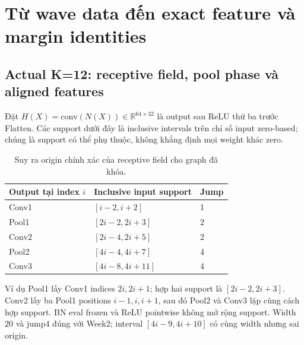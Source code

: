 \documentclass[11pt,a4paper]{article}
\newcommand{\R}{\mathbb R}
\theoremstyle{remark}
\begin{document}
\section{Từ wave data đến exact feature và margin identities}
\subsection{Actual K=12: receptive field, pool phase và aligned features}
\label{sec:actual-feature}
Đặt $H(X)=\mathrm{conv}(N(X))\in\R^{64\times32}$ là output sau ReLU thứ ba trước Flatten.
Các support dưới đây là inclusive intervals trên chỉ số input zero-based;
chúng là support có thể phụ thuộc, không khẳng định mọi weight khác zero.
\begin{table}[!htbp]\centering
\caption{Suy ra origin chính xác của receptive field cho graph đã khóa.}
\begin{tabular}{@{}lll@{}}\toprule
Output tại index $i$ & Inclusive input support & Jump\\\midrule
Conv1 & $[i-2,i+2]$ & 1\\
Pool1 & $[2i-2,2i+3]$ & 2\\
Conv2 & $[2i-4,2i+5]$ & 2\\
Pool2 & $[4i-4,4i+7]$ & 4\\
Conv3 & $[4i-8,4i+11]$ & 4\\\bottomrule
\end{tabular}
\end{table}
Ví dụ Pool1 lấy Conv1 indices $2i,2i+1$; hợp hai support là
$[2i-2,2i+3]$. Conv2 lấy ba Pool1 positions $i-1,i,i+1$,
sau đó Pool2 và Conv3 lặp cùng cách hợp support. BN eval frozen và ReLU
pointwise không mở rộng support. Width $20$ và jump4 đúng với Week2;
interval $[4i-9,4i+10]$ có cùng width nhưng sai origin.
\end{document}
